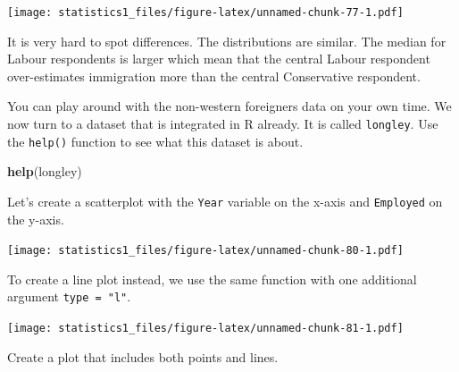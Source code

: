 \documentclass[]{article}
\newenvironment{Shaded}{\begin{snugshade}}{\end{snugshade}}
\newcommand{\KeywordTok}[1]{\textcolor[rgb]{0.13,0.29,0.53}{\textbf{#1}}}
\newcommand{\DataTypeTok}[1]{\textcolor[rgb]{0.13,0.29,0.53}{#1}}
\newcommand{\StringTok}[1]{\textcolor[rgb]{0.31,0.60,0.02}{#1}}
\newcommand{\CommentTok}[1]{\textcolor[rgb]{0.56,0.35,0.01}{\textit{#1}}}
\newcommand{\OperatorTok}[1]{\textcolor[rgb]{0.81,0.36,0.00}{\textbf{#1}}}
\newcommand{\NormalTok}[1]{#1}
\theoremstyle{definition}
\theoremstyle{definition}
\theoremstyle{definition}
\theoremstyle{remark}
\begin{document}
\texttt{[image: statistics1\_files/figure-latex/unnamed-chunk-77-1.pdf]}

It is very hard to spot differences. The distributions are similar. The
median for Labour respondents is larger which mean that the central
Labour respondent over-estimates immigration more than the central
Conservative respondent.

You can play around with the non-western foreigners data on your own
time. We now turn to a dataset that is integrated in R already. It is
called \texttt{longley}. Use the \texttt{help()} function to see what
this dataset is about.

\begin{Shaded}
\begin{Highlighting}[]
\KeywordTok{help}\NormalTok{(longley)}
\end{Highlighting}
\end{Shaded}

Let's create a scatterplot with the \texttt{Year} variable on the x-axis
and \texttt{Employed} on the y-axis.

\begin{Shaded}
\end{Shaded}

\texttt{[image: statistics1\_files/figure-latex/unnamed-chunk-80-1.pdf]}

To create a line plot instead, we use the same function with one
additional argument \texttt{type\ =\ "l"}.

\begin{Shaded}
\end{Shaded}

\texttt{[image: statistics1\_files/figure-latex/unnamed-chunk-81-1.pdf]}

Create a plot that includes both points and lines.
\end{document}
